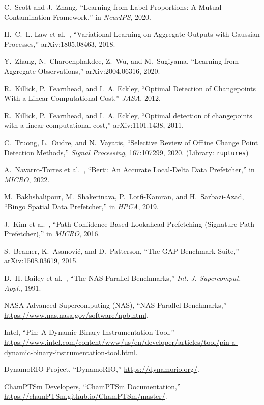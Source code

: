 \documentclass[conference]{IEEEtran}
\newcommand{\etal}{et al.\ }
\begin{document}
\begin{thebibliography}{99}
C.~Scott and J.~Zhang, ``Learning from Label Proportions: A Mutual Contamination Framework,'' in \emph{NeurIPS}, 2020.

H.~C.~L. Law \etal, ``Variational Learning on Aggregate Outputs with Gaussian Processes,'' arXiv:1805.08463, 2018.

Y.~Zhang, N.~Charoenphakdee, Z.~Wu, and M.~Sugiyama, ``Learning from Aggregate Observations,'' arXiv:2004.06316, 2020.

R.~Killick, P.~Fearnhead, and I.~A. Eckley, ``Optimal Detection of Changepoints With a Linear Computational Cost,'' \emph{JASA}, 2012.

R.~Killick, P.~Fearnhead, and I.~A. Eckley, ``Optimal detection of changepoints with a linear computational cost,'' arXiv:1101.1438, 2011.

C.~Truong, L.~Oudre, and N.~Vayatis, ``Selective Review of Offline Change Point Detection Methods,'' \emph{Signal Processing}, 167:107299, 2020. (Library: \texttt{ruptures})

A.~Navarro-Torres \etal, ``Berti: An Accurate Local-Delta Data Prefetcher,'' in \emph{MICRO}, 2022.

M.~Bakhshalipour, M.~Shakerinava, P.~Lotfi-Kamran, and H.~Sarbazi-Azad, ``Bingo Spatial Data Prefetcher,'' in \emph{HPCA}, 2019.

J.~Kim \etal, ``Path Confidence Based Lookahead Prefetching (Signature Path Prefetcher),'' in \emph{MICRO}, 2016.

S.~Beamer, K.~Asanovi\'c, and D.~Patterson, ``The GAP Benchmark Suite,'' arXiv:1508.03619, 2015.

D.~H. Bailey \etal, ``The NAS Parallel Benchmarks,'' \emph{Int. J. Supercomput. Appl.}, 1991.

NASA Advanced Supercomputing (NAS), ``NAS Parallel Benchmarks,'' \url{https://www.nas.nasa.gov/software/npb.html}.

Intel, ``Pin: A Dynamic Binary Instrumentation Tool,'' \url{https://www.intel.com/content/www/us/en/developer/articles/tool/pin-a-dynamic-binary-instrumentation-tool.html}.

DynamoRIO Project, ``DynamoRIO,'' \url{https://dynamorio.org/}.

ChamPTSm Developers, ``ChamPTSm Documentation,'' \url{https://chamPTSm.github.io/ChamPTSm/master/}.

\end{thebibliography}
\end{document}
